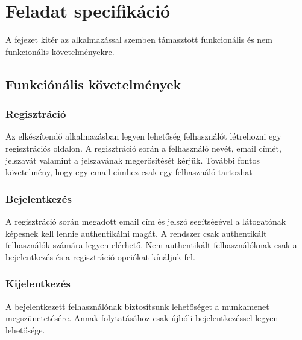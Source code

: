 \chapter{Feladat specifikáció}

A fejezet kitér az alkalmazással szemben támasztott funkcionális és nem funkcionális követelményekre.

\section{Funkciónális követelmények}

\subsection{Regisztráció}
Az elkészítendő alkalmazásban legyen lehetőség felhasználót létrehozni egy regisztrációs oldalon.
A regisztráció során a felhasználó nevét, email címét, jelszavát valamint a jelszavának megerősítését kérjük.
További fontos követelmény, hogy egy email címhez csak egy felhasználó tartozhat

\subsection{Bejelentkezés}
A regisztráció során megadott email cím és jelszó segítségével a látogatónak képesnek kell lennie authentikálni magát.
A rendszer csak authentikált felhasználók számára legyen elérhető.
Nem authentikált felhasználóknak csak a bejelentkezés és a regisztráció opciókat kínáljuk fel.

\subsection{Kijelentkezés}
A bejelentkezett felhasználónak biztosítsunk lehetőséget a munkamenet megszünetetésére. 
Annak folytatásához csak újbóli bejelentkezéssel legyen lehetősége.

